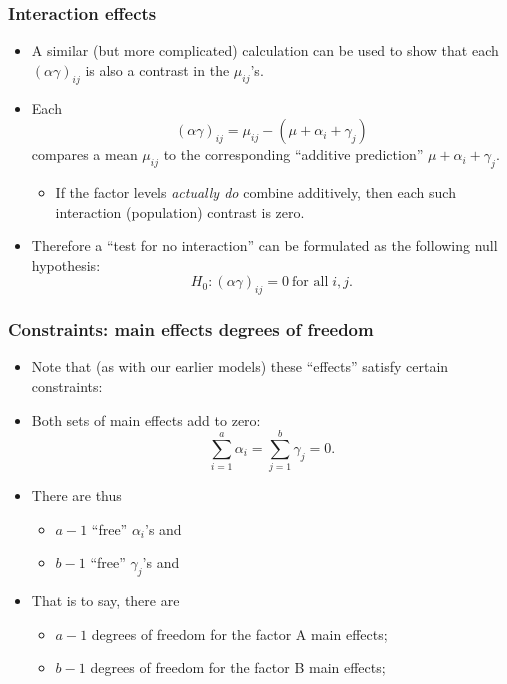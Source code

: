 \documentclass[a4paper]{article}\usepackage[]{graphicx}\usepackage[]{xcolor}
\begin{document}
\subsubsection{Interaction effects}
\begin{itemize}
	\item A similar (but more complicated) calculation can be used to show that each \( (\alpha \gamma)_{ij} \) is also a contrast in the \( \mu_{ij} \)'s.
	\item Each
	\[
		(\alpha\gamma)_{ij}=\mu_{ij}-(\mu+\alpha_i+\gamma_j)
	\]
	compares a mean \( \mu_{ij} \) to the corresponding ``additive prediction'' \( \mu + \alpha_i + \gamma_j \).
	\begin{itemize}
		\item If the factor levels \textit{actually do} combine additively, then each such interaction (population) contrast is zero.
	\end{itemize}
	\item Therefore a ``test for no interaction'' can be formulated as the following null hypothesis:
	\[
		H_0: (\alpha\gamma)_{ij}=0 \ \text{for all}\;i,j.
	\]
\end{itemize}
\subsubsection{Constraints: main effects degrees of freedom}
\begin{itemize}
	\item Note that (as with our earlier models) these ``effects'' satisfy certain constraints:
	\item Both sets of main effects add to zero:
	\[
		\sum_{i=1}^{a} \alpha_i = \sum_{j=1}^{b} \gamma_j = 0.
	\]
	\item There are thus
	\begin{itemize}
		\item \( a-1 \) ``free'' \( \alpha_i \)'s and
		\item \( b-1 \) ``free'' \( \gamma_j \)'s and
	\end{itemize}
	\item That is to say, there are
	\begin{itemize}
		\item \( a-1 \) degrees of freedom for the factor A main effects;
		\item \( b-1 \) degrees of freedom for the factor B main effects;
	\end{itemize}
\end{itemize}
\end{document}
